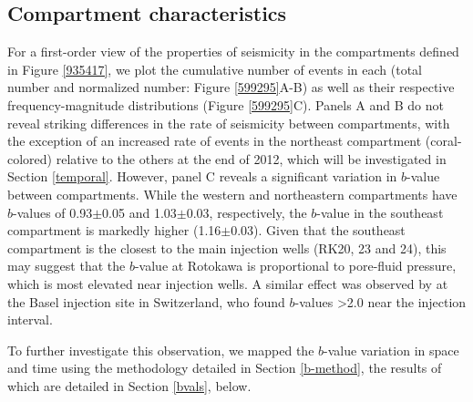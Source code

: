 \subsection{Compartment characteristics}
For a first-order view of the properties of seismicity in the compartments defined in Figure \ref{935417}, we plot the cumulative number of events in each (total number and normalized number: Figure \ref{599295}A-B) as well as their respective frequency-magnitude distributions (Figure \ref{599295}C). Panels A and B do not reveal striking differences in the rate of seismicity between compartments, with the exception of an increased rate of events in the northeast compartment (coral-colored) relative to the others at the end of 2012, which will be investigated in Section \ref{temporal}. However, panel C reveals a significant variation in $b$-value between compartments. While the western and northeastern compartments have $b$-values of 0.93$\pm$0.05 and 1.03$\pm$0.03, respectively, the $b$-value in the southeast compartment is markedly higher (1.16$\pm$0.03). Given that the southeast compartment is the closest to the main injection wells (RK20, 23 and 24), this may suggest that the $b$-value at Rotokawa is proportional to pore-fluid pressure, which is most elevated near injection wells. A similar effect was observed by \citet{Bachmann_2012} at the Basel injection site in Switzerland, who found $b$-values \textgreater2.0 near the injection interval.

To further investigate this observation, we mapped the $b$-value variation in space and time using the methodology detailed in Section \ref{b-method}, the results of which are detailed in Section \ref{bvals}, below.

